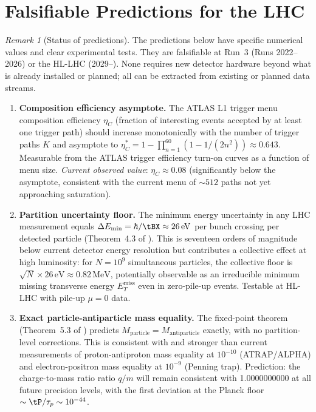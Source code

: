 \documentclass[twocolumn,10pt,a4paper]{article}
\theoremstyle{thmstyle}
\theoremstyle{definition}
\theoremstyle{remark}
\newtheorem{remark}[theorem]{Remark}
\newcommand{\etaC}{\eta_{C}}
\begin{document}
\section{Falsifiable Predictions for the LHC}
\label{sec:lhc_predictions}

\begin{remark}[Status of predictions]
The predictions below have specific numerical values and clear
experimental tests. They are falsifiable at Run~3 (Runs 2022--2026)
or the HL-LHC (2029--). None requires new detector hardware beyond
what is already installed or planned; all can be extracted from
existing or planned data streams.
\end{remark}

\begin{enumerate}[nosep,label=\textbf{P\arabic*.}]

\item \label{pred:eta}
\textbf{Composition efficiency asymptote.}
The ATLAS L1 trigger menu composition efficiency $\etaC$ (fraction of
interesting events accepted by at least one trigger path) should increase
monotonically with the number of trigger paths $K$ and asymptote to
$\etaC^* = 1 - \prod_{n=1}^{60}(1-1/(2n^2)) \approx 0.643$.
Measurable from the ATLAS trigger efficiency turn-on curves as a
function of menu size.
\emph{Current observed value}: $\etaC \approx 0.08$
(significantly below the asymptote, consistent with the current menu
of $\sim 512$ paths not yet approaching saturation).

\item \label{pred:timing}
\textbf{Partition uncertainty floor.}
The minimum energy uncertainty in any LHC measurement equals
$\Delta E_{\min} = \hbar/\tBX \approx 26\,\mathrm{eV}$ per bunch crossing
per detected particle (Theorem~4.3 of \citealt{companion:spectrometer}).
This is seventeen orders of magnitude below current detector energy
resolution but contributes a collective effect at high luminosity:
for $N = 10^9$ simultaneous particles, the collective floor is
$\sqrt{N}\times26\,\mathrm{eV} \approx 0.82\,\mathrm{MeV}$,
potentially observable as an irreducible minimum missing transverse
energy $E_T^{\mathrm{miss}}$ even in zero-pile-up events.
Testable at HL-LHC with pile-up $\mu = 0$ data.

\item \label{pred:antiparticle}
\textbf{Exact particle-antiparticle mass equality.}
The fixed-point theorem (Theorem~5.3 of \citealt{companion:spectrometer})
predicts $M_{\mathrm{particle}} = M_{\mathrm{antiparticle}}$ exactly,
with no partition-level corrections.
This is consistent with and stronger than current measurements of
proton-antiproton mass equality at $10^{-10}$ (ATRAP/ALPHA) and
electron-positron mass equality at $10^{-9}$ (Penning trap).
Prediction: the charge-to-mass ratio ratio $q/m$
will remain consistent with 1.0000000000 at all future precision levels,
with the first deviation at the Planck floor $\sim\tP/\tau_p \sim 10^{-44}$.


\end{enumerate}
\end{document}
